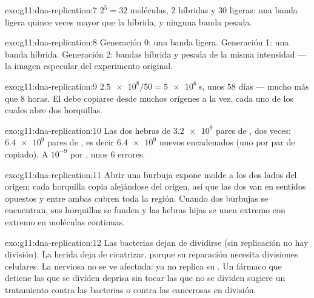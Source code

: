 \begin{solution}{exo:g11:dna-replication:7}
$2^5 = 32$ moléculas, 2 híbridas y 30 ligeras: una banda ligera quince
veces mayor que la híbrida, y ninguna banda pesada.
\end{solution}

\begin{solution}{exo:g11:dna-replication:8}
Generación 0: una banda ligera. Generación 1: una banda híbrida.
Generación 2: bandas híbrida y pesada de la misma intensidad --- la
imagen especular del experimento original.
\end{solution}

\begin{solution}{exo:g11:dna-replication:9}
$\num{2.5e8}/50 = \num{5e6}\,\unit{s}$, unos 58 días --- mucho más que
8 horas. El  debe copiarse desde muchos orígenes a la vez,
cada uno de los cuales abre dos horquillas.
\end{solution}

\begin{solution}{exo:g11:dna-replication:10}
Las dos hebras de $\num{3.2e9}$ pares de , dos veces:
$\num{6.4e9}$ pares de , es decir $\num{6.4e9}$  nuevos
encadenados (uno por par de  copiado). A $10^{-9}$ por ,
unos 6 errores.
\end{solution}

\begin{solution}{exo:g11:dna-replication:11}
Abrir una burbuja expone molde a los dos lados del origen; cada
horquilla copia alejándose del origen, así que las dos van en sentidos
opuestos y entre ambas cubren toda la región. Cuando dos burbujas se
encuentran, sus horquillas se funden y las hebras hijas se unen extremo
con extremo en moléculas continuas.
\end{solution}

\begin{solution}{exo:g11:dna-replication:12}
Las bacterias dejan de dividirse (sin replicación no hay división). La
herida deja de cicatrizar, porque su reparación necesita divisiones
celulares. La  nerviosa no se ve afectada: ya no replica su .
Un fármaco que detiene las  que se dividen deprisa sin tocar las
que no se dividen sugiere un tratamiento contra las bacterias o contra
las  cancerosas en división.
\end{solution}


